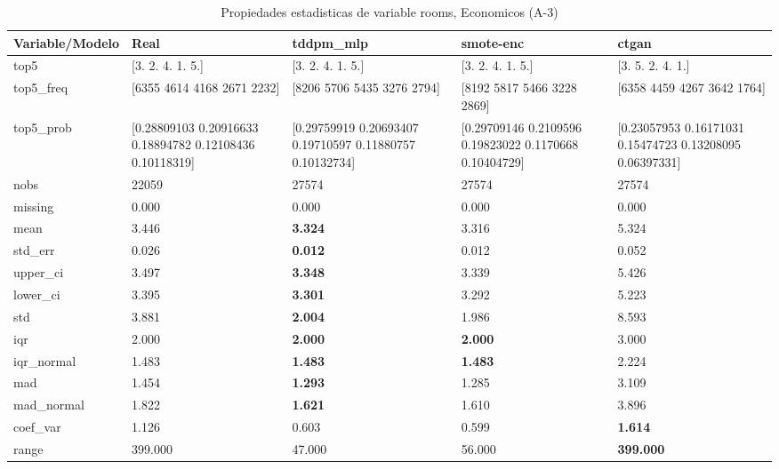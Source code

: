 \begin{table}[H]
\centering
\fontsize{8}{14}\selectfont
\caption{Propiedades  estadisticas de variable rooms, Economicos (A-3)}
\label{table-stats-economicos-a-3-rooms}
\begin{tabular}{|l|m{10em}|m{10em}|m{10em}|m{10em}|}
\hline
 \rowcolor[gray]{0.8}
Variable/Modelo & Real & tddpm\_mlp & smote-enc & ctgan \\
\hline top5 & [3. 2. 4. 1. 5.] & [3. 2. 4. 1. 5.] & [3. 2. 4. 1. 5.] & [3. 5. 2. 4. 1.] \\
\hline top5\_freq & [6355 4614 4168 2671 2232] & [8206 5706 5435 3276 2794] & [8192 5817 5466 3228 2869] & [6358 4459 4267 3642 1764] \\
\hline top5\_prob & [0.28809103 0.20916633 0.18894782 0.12108436 0.10118319] & [0.29759919 0.20693407 0.19710597 0.11880757 0.10132734] & [0.29709146 0.2109596  0.19823022 0.1170668  0.10404729] & [0.23057953 0.16171031 0.15474723 0.13208095 0.06397331] \\
\hline nobs & 22059 & 27574 & 27574 & 27574 \\
\hline missing & 0.000 & 0.000 & 0.000 & 0.000 \\
\hline mean & 3.446 & \bfseries 3.324 & 3.316 & \cellcolor[rgb]{0.9, 0.54, 0.52} 5.324 \\
\hline std\_err & 0.026 & \bfseries 0.012 & 0.012 & \cellcolor[rgb]{0.9, 0.54, 0.52} 0.052 \\
\hline upper\_ci & 3.497 & \bfseries 3.348 & 3.339 & \cellcolor[rgb]{0.9, 0.54, 0.52} 5.426 \\
\hline lower\_ci & 3.395 & \bfseries 3.301 & 3.292 & \cellcolor[rgb]{0.9, 0.54, 0.52} 5.223 \\
\hline std & 3.881 & \bfseries 2.004 & 1.986 & \cellcolor[rgb]{0.9, 0.54, 0.52} 8.593 \\
\hline iqr & 2.000 & \bfseries 2.000 & \bfseries 2.000 & \cellcolor[rgb]{0.9, 0.54, 0.52} 3.000 \\
\hline iqr\_normal & 1.483 & \bfseries 1.483 & \bfseries 1.483 & \cellcolor[rgb]{0.9, 0.54, 0.52} 2.224 \\
\hline mad & 1.454 & \bfseries 1.293 & 1.285 & \cellcolor[rgb]{0.9, 0.54, 0.52} 3.109 \\
\hline mad\_normal & 1.822 & \bfseries 1.621 & 1.610 & \cellcolor[rgb]{0.9, 0.54, 0.52} 3.896 \\
\hline coef\_var & 1.126 & 0.603 & \cellcolor[rgb]{0.9, 0.54, 0.52} 0.599 & \bfseries 1.614 \\
\hline range & 399.000 & \cellcolor[rgb]{0.9, 0.54, 0.52} 47.000 & 56.000 & \bfseries 399.000 \\

\end{tabular}
\end{table}
